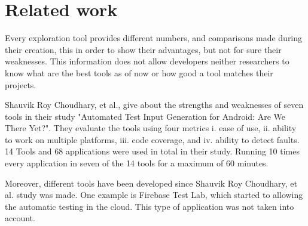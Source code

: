 
\chapter{Related work} %


\label{Chapter3} %


Every exploration tool provides different numbers, and comparisons made during their creation, this in order to show their advantages, but not for sure their weaknesses. This information does not allow developers neither researchers to know what are the best tools as of now or how good a tool matches their projects. 

Shauvik Roy Choudhary, et al., \MARIO{[CITE]} give about the strengths and weaknesses of seven tools in their study "Automated Test Input Generation for Android:
Are We There Yet?". They evaluate the tools using four metrics i. ease
of use, ii. ability to work on multiple platforms, iii. code coverage, and iv.
ability to detect faults. 14 Tools and 68 applications were used in total in their study. Running 10 times every application in seven of the 14 tools for a maximum of 60 minutes.

Moreover, different tools have been developed since Shauvik Roy Choudhary, et al. \MARIO{[CITE]} study was made. One example is Firebase Test Lab, which started to allowing the automatic testing in the cloud. This type of application was not taken into account.

